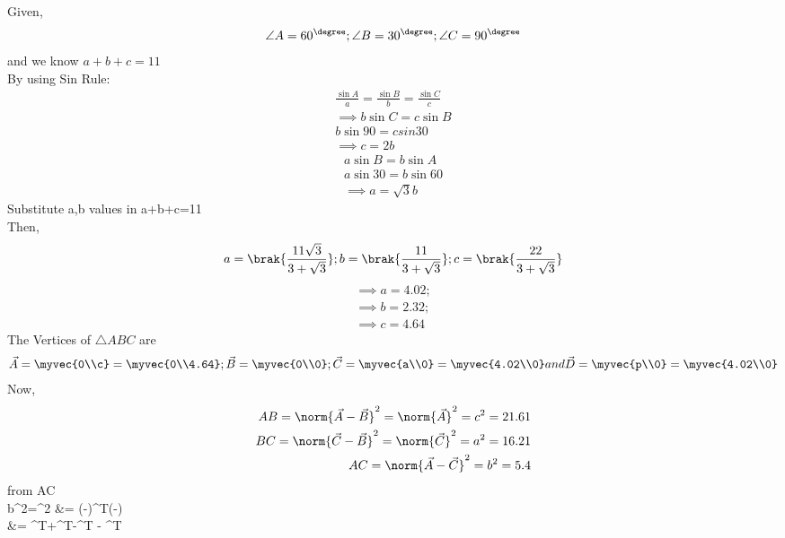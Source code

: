 \documentclass[journal,12pt,twocolumn]{IEEEtran}
\begin{document}
Given,
\begin{align}
    \angle A=60^{\degree};
    \angle B=30^{\degree};
    \angle C=90^{\degree}
\end{align}
and we know $a+b+c=11$
\\
By using Sin Rule:
\begin{align}
\frac{\sin{A}}{a}=\frac{\sin{B}}{b}=\frac{\sin{C}}{c}
\\
\implies b\sin{C}=c\sin{B}
\\
b\sin{90}=csin{30}
\\
\implies c=2b
\end{align}
\begin{align}
a\sin{B}=b\sin{A}
\\
a\sin{30}=b\sin{60}
\\
\implies a=\sqrt{3}b
\end{align}
Substitute a,b values in a+b+c=11
\\
Then,
\begin{align}
    a=\brak{\frac{11\sqrt{3}}{3+\sqrt{3}}};
    b=\brak{\frac{11}{3+\sqrt{3}}};
    c=\brak{\frac{22}{3+\sqrt{3}}}
\end{align}
\begin{align}
    \implies a=4.02;
    \\
    \implies b=2.32;
    \\
    \implies c=4.64
\end{align} 
The Vertices of $\triangle ABC$ are\m
\begin{align}
    \Vec{A}=\myvec{0\\c}=\myvec{0\\4.64};\Vec{B}=\myvec{0\\0};\Vec{C}=\myvec{a\\0}=\myvec{4.02\\0} and \Vec{D}=\myvec{p\\0}=\myvec{4.02\\0}
\end{align}
Now,
\begin{align}
AB=\norm{\vec{A}-\vec{B}}^2 = \norm{\vec{A}}^2  = c^2 =21.61
\\
BC=\norm{\vec{C}-\vec{B}}^2 = \norm{\vec{C}}^2 =a^2=16.21
\\
AC=\norm{\vec{A}-\vec{C}}^2 = b^2=5.4
\end{align}
from AC 
\\
b^2=^2 &= ({-})^T({-})
\\
&= ^T+^T-^T - ^T
\end{document}
